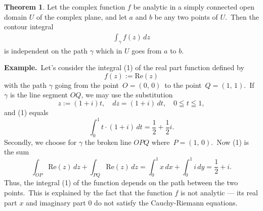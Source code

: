 \documentclass[12pt]{article}
\theoremstyle{definition}
\newtheorem*{thmplain}{Theorem}
\begin{document}
\begin{thmplain}
Let the complex function $f$ be analytic in a simply connected open domain $U$ of the complex plane, and let $a$ and $b$ be any two points of $U$.\, Then the contour integral
\begin{align}
\int_\gamma f(z)\,dz
\end{align}
is independent on the path $\gamma$ which in $U$ goes from $a$ to $b$.
\end{thmplain}


\textbf{Example.}\, Let's consider the integral (1) of the real part function defined by
$$f(z) := \mbox{Re}(z)$$
with the path $\gamma$ going from the point\, $O = (0,\,0)$\, to the point\, $Q = (1,\,1)$.\, If $\gamma$ is the line segment $OQ$, we may use the substitution
    $$z := (1\!+\!i)t,\quad dz = (1\!+\!i)\,dt,\quad 0 \leqq t \leqq 1,$$
and (1) equals 
        $$\int_0^1t\!\cdot\!(1\!+\!i)\,dt = \frac{1}{2}\!+\!\frac{1}{2}i.$$
Secondly, we choose for $\gamma$ the broken line $OPQ$ where\, $P = (1,\,0)$.\, Now (1) is the sum
      $$\int_{OP}\mbox{Re}(z)\,dz+\int_{PQ}\mbox{Re}(z)\,dz 
   = \int_0^1x\,dx+\int_0^1i\,dy = \frac{1}{2}\!+\!i.$$
Thus, the integral (1) of the function depends on the path between the two points.\, This is explained by the fact that the  function $f$ is not analytic --- its real part $x$ and imaginary part 0 do not satisfy the Cauchy-Riemann equations.
\end{document}
